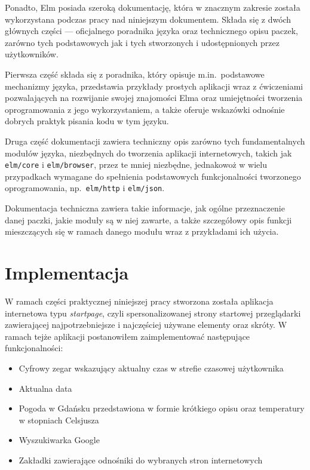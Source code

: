 \documentclass[twoside,a4paper]{report}
\begin{document}
Ponadto, Elm posiada szeroką dokumentację, która w znacznym zakresie została wykorzystana podczas pracy nad niniejszym dokumentem.
Składa się z dwóch głównych części --- oficjalnego poradnika języka oraz technicznego opisu paczek, zarówno tych podstawowych jak i tych stworzonych i udostępnionych przez użytkowników.

Pierwsza część składa się z poradnika, który opisuje m.in.~podstawowe mechanizmy języka, przedstawia przykłady prostych aplikacji wraz z ćwiczeniami pozwalających na rozwijanie swojej znajomości Elma oraz umiejętności tworzenia oprogramowania z jego wykorzystaniem, a także oferuje wskazówki odnośnie dobrych praktyk pisania kodu w tym języku.

Druga część dokumentacji zawiera techniczny opis zarówno tych fundamentalnych modułów języka, niezbędnych do tworzenia aplikacji internetowych, takich jak \texttt{elm/core} i \texttt{elm/browser}, przez te mniej niezbędne, jednakowoż w wielu przypadkach wymagane do spełnienia podstawowych funkcjonalności tworzonego oprogramowania, np.~\texttt{elm/http} i \texttt{elm/json}.

Dokumentacja techniczna zawiera takie informacje, jak ogólne przeznaczenie danej paczki, jakie moduły są w niej zawarte, a także szczegółowy opis funkcji mieszczących się w ramach danego modułu wraz z przykładami ich użycia.


\chapter{Implementacja}
W ramach części praktycznej niniejszej pracy stworzona została aplikacja internetowa typu \textit{startpage}, czyli spersonalizowanej strony startowej przeglądarki zawierającej najpotrzebniejsze i najczęściej używane elementy oraz skróty.
W ramach tejże aplikacji postanowiłem zaimplementować następujące funkcjonalności:
\begin{itemize}[noitemsep,topsep=0pt]
    \item Cyfrowy zegar wskazujący aktualny czas w strefie czasowej użytkownika
    \item Aktualna data
    \item Pogoda w Gdańsku przedstawiona w formie krótkiego opisu oraz temperatury w stopniach Celsjusza
    \item Wyszukiwarka Google
    \item Zakładki zawierające odnośniki do wybranych stron internetowych
\end{itemize}
\end{document}
